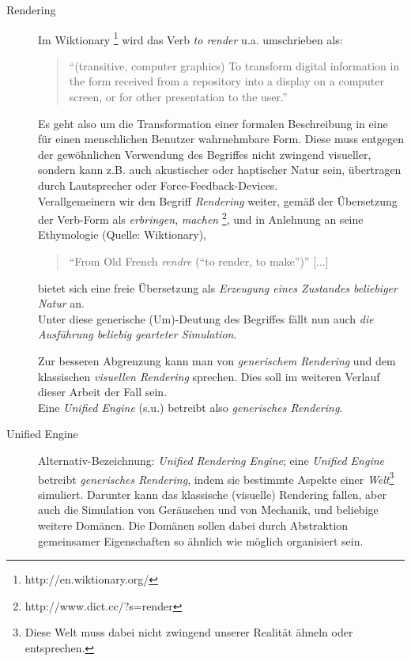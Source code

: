 \begin{description}

	\item[Rendering]
	Im Wiktionary \footnote{http://en.wiktionary.org/} wird das Verb \emph{to render} u.a. umschrieben als:
	\begin{quote}
		"`(transitive, computer graphics) To transform digital information in the form received from a repository into a 
		display on a computer screen, or for other presentation to the user."'
	\end{quote}	
	Es geht also um die Transformation einer formalen Beschreibung in eine für einen menschlichen Benutzer wahrnehmbare 
	Form. Diese muss entgegen der gewöhnlichen Verwendung des Begriffes nicht zwingend visueller, sondern kann z.B. auch 
	akustischer oder haptischer Natur sein, übertragen durch Lautsprecher oder Force-Feedback-Devices.\\
	
	Verallgemeinern wir den Begriff \emph{Rendering} weiter, gemäß der Übersetzung der Verb-Form als 
	\emph{erbringen}, \emph{machen} \footnote{http://www.dict.cc/?s=render},	
	und in Anlehnung an seine Ethymologie (Quelle: Wiktionary),
	\begin{quote}
		"`From Old French \emph{rendre} (“to render, to make”)"' [...]
	\end{quote}
	
	bietet sich eine freie Übersetzung als \emph{Erzeugung eines Zustandes beliebiger Natur} an.\\
	Unter diese generische (Um)-Deutung des Begriffes fällt nun auch \emph{die Ausführung beliebig gearteter Simulation}.
	
	Zur besseren Abgrenzung kann man von \emph{generischem Rendering} und dem klassischen 
	\emph{visuellen Rendering} sprechen. Dies soll im weiteren Verlauf dieser Arbeit der Fall sein.\\
	Eine \emph{Unified Engine} (s.u.) betreibt also \emph{generisches Rendering}.
	
	
	\item[Unified Engine] Alternativ-Bezeichnung: \emph{Unified Rendering Engine};
	eine \emph{Unified Engine} betreibt \emph{generisches Rendering}, indem sie bestimmte Aspekte einer 
	\emph{Welt}\footnote{Diese Welt muss dabei nicht zwingend unserer Realität ähneln oder entsprechen.} simuliert. 
	Darunter kann das klassische (visuelle) Rendering fallen, aber auch die Simulation von Geräuschen und von Mechanik, und 
	beliebige weitere Domänen. Die Domänen sollen dabei durch Abstraktion gemeinsamer Eigenschaften so ähnlich wie möglich
	organisiert sein.
	

\end{description}
